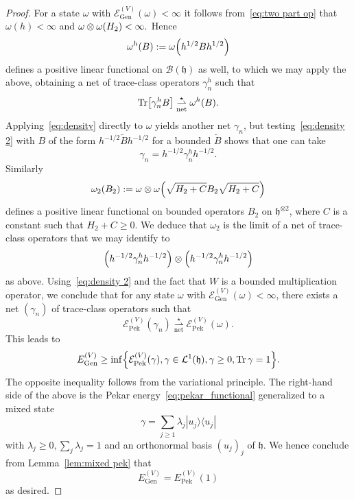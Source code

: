 \documentclass[10pt]{amsart}
\theoremstyle{definition}\newtheorem{defi}[theo]{Definition}\newtheorem{rema}[theo]{Remark}\newtheorem{exam}[theo]{Example}\newtheorem{exem}[theo]{Example}\newtheorem{nota}[theo]{Notation}
\DeclareMathOperator{\Tr}{Tr}
\DeclareMathOperator{\Pek}{Pek}
\DeclareMathOperator{\Genn}{Gen}
\newcommand{\cL}{\mathcal{L}}
\newcommand{\gh}{\mathfrak{h}}
\newcommand{\cB}{\mathcal{B}}
\newcommand{\cE}{\mathcal{E}}
\newcommand{\1}{\mathds{1}}
\newcommand{\cvnet}{\overset{\star}{\underset{\mathrm{net}}{\rightharpoonup}}}
\let\oldin\in
\renewcommand{\in}{\mathchoice{\oldin}{\oldin}{\,\oldin\,}{\,\oldin\,}}
\let\originalleft\left
\let\originalright\right
\renewcommand{\left}{\mathopen{}\mathclose\bgroup\originalleft}
\renewcommand{\right}{\aftergroup\egroup\originalright}
\begin{document}
\begin{proof}
For a state $\omega$ with $\cE_{\Genn}^{(V)}(\omega)<\infty$ it follows from~\eqref{eq:two part op} that $\omega (h) < \infty$ and $ \omega \otimes \omega \left(H_2 \right) < \infty.$ Hence
\begin{equation*}
\omega ^h (B) := \omega \left(h^{1/2} B h^{1/2}\right)
\end{equation*}
defines a positive linear functional on $\cB (\gh)$ as well, to which we may apply the above, obtaining a net of trace-class operators $\gamma_n^h$ such that
\begin{equation}\label{eq:density 2}
\Tr \left[\gamma_n^h B \right] \cvnet \omega^h (B).
\end{equation}
Applying~\eqref{eq:density} directly to $\omega$ yields another net $\gamma_n$, but testing~\eqref{eq:density 2} with $B$ of the form $h^{-1/2} \widetilde{B} h^{-1/2}$ for a bounded $\widetilde{B}$ shows that one can take
\begin{equation*}
\gamma_n = h^{-1/2} \gamma_n ^h h ^{-1/2}.
\end{equation*}
Similarly
\begin{equation*}
\omega_2 (B_2) := \omega \otimes \omega \left(\sqrt{H_2 +C} B_2 \sqrt{H_2 +C} \right)
\end{equation*}
defines a positive linear functional on bounded operators $B_2$ on $\gh^{\otimes 2}$, where $C$ is a constant such that $H_2 + C \geq 0$. We deduce that $\omega_2$ is the limit of a net of trace-class operators that we may identify to
\begin{equation*}
\left(h^{-1/2} \gamma_n ^h h ^{-1/2}\right) \otimes \left(h^{-1/2} \gamma_n ^h h ^{-1/2}\right)
\end{equation*}
as above. Using~\eqref{eq:density 2} and the fact that $W$ is a bounded multiplication operator, we conclude that for any state $\omega$ with $\cE_{\Genn}^{(V)}(\omega)<\infty$, there exists a net $(\gamma_n)$ of trace-class operators such that
\begin{equation*}
\cE_{\Pek}^{(V)}(\gamma_n) \cvnet \cE_{\Pek}^{(V)}(\omega).
\end{equation*}
This leads to
\begin{equation}\label{eq:gen ener 2}
E_{\Genn}^{(V)}\geq \inf\left\lbrace \cE_{\Pek}^{(V)}(\gamma), \gamma \in \cL^1(\gh), \gamma \geq 0, \Tr \gamma = 1\right\rbrace.
\end{equation}
The opposite inequality follows from the variational principle. The right-hand side of the above is the Pekar energy~\eqref{eq:pekar_functional} generalized to a mixed state
\begin{equation*}
\gamma = \sum_{j\geq 1} \lambda_j |u_j\rangle \langle u_j|
\end{equation*}
with $\lambda_j \geq 0, \sum_j \lambda_j = 1$ and an orthonormal basis $(u_j)_j$ of $\gh$. We hence conclude from Lemma~\ref{lem:mixed pek} that
\begin{equation*}
E_{\Genn}^{(V)} = E^{(V)}_{\Pek}(1)
\end{equation*}
as desired.
\end{proof}
\end{document}
